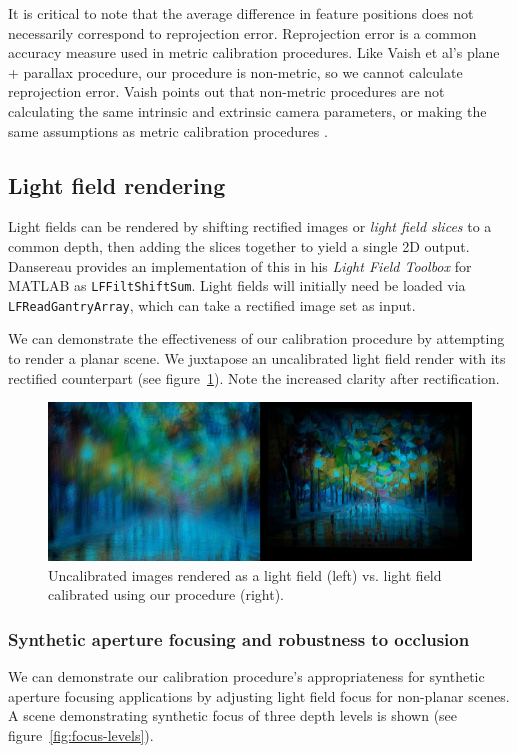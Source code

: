 \documentclass[../main.tex]{subfiles}
\begin{document}
It is critical to note that the average difference in feature positions does not necessarily correspond to reprojection error. Reprojection error is a common accuracy measure used in metric calibration procedures. Like Vaish et al's plane + parallax procedure, our procedure is non-metric, so we cannot calculate reprojection error. Vaish points out that non-metric procedures are not calculating the same intrinsic and extrinsic camera parameters, or making the same assumptions as metric calibration procedures \cite{vaish2004using}.

\subsection{Light field rendering}
Light fields can be rendered by shifting rectified images or \emph{light field slices} to a common depth, then adding the slices together to yield a single 2D output. Dansereau provides an implementation of this in his \emph{Light Field Toolbox} for MATLAB as \texttt{LFFiltShiftSum}. Light fields will initially need be loaded via \texttt{LFReadGantryArray}, which can take a rectified image set as input.

We can demonstrate the effectiveness of our calibration procedure by attempting to render a planar scene. We juxtapose an uncalibrated light field render with its rectified counterpart (see figure~\ref{fig:uncalibrated-vs-calibrated}). Note the increased clarity after rectification.

\begin{figure}[H]
    \centering
    \includegraphics[width=\linewidth]{images/uncalibrated-vs-calibrated}
    \caption{Uncalibrated images rendered as a light field (left) vs. light field calibrated using our procedure (right).}
    \label{fig:uncalibrated-vs-calibrated}
\end{figure}

\newpage
\subsubsection{Synthetic aperture focusing and robustness to occlusion}
We can demonstrate our calibration procedure's appropriateness for synthetic aperture focusing applications by adjusting light field focus for non-planar scenes. A scene demonstrating synthetic focus of three depth levels is shown (see figure~\ref{fig:focus-levels}).
\end{document}
